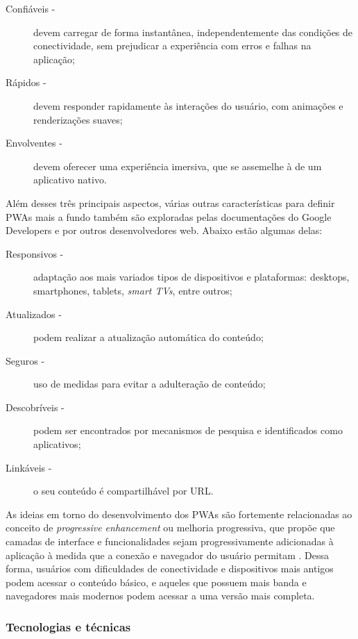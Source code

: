 \begin{description}
\item[Confiáveis -]devem carregar de forma instantânea, independentemente das condições de conectividade, sem prejudicar a experiência com erros e falhas na aplicação;
\item[Rápidos -]devem responder rapidamente às interações do usuário, com animações e renderizações suaves;
\item[Envolventes -]devem oferecer uma experiência imersiva, que se assemelhe à de um aplicativo nativo.
\end{description}

Além desses três principais aspectos, várias outras características para definir PWAs mais a fundo também são exploradas pelas documentações do Google Developers \cite{googledevpwachecklist} e por outros desenvolvedores web. Abaixo estão algumas delas:

\begin{description}
\item[Responsivos -]adaptação aos mais variados tipos de dispositivos e plataformas: desktops, smartphones, tablets, \textit{smart TVs}, entre outros;
\item[Atualizados -]podem realizar a atualização automática do conteúdo;
\item[Seguros -]uso de medidas para evitar a adulteração de conteúdo;
\item[Descobríveis -]podem ser encontrados por mecanismos de pesquisa e identificados como aplicativos;
\item[Linkáveis -]o seu conteúdo é compartilhável por URL.
\end{description}

As ideias em torno do desenvolvimento dos PWAs são fortemente relacionadas ao conceito de \textit{progressive enhancement} ou melhoria progressiva, que propõe que camadas de interface e funcionalidades sejam progressivamente adicionadas à aplicação à medida que a conexão e navegador do usuário permitam \cite{champeon}. Dessa forma, usuários com dificuldades de conectividade e dispositivos mais antigos podem acessar o conteúdo básico, e aqueles que possuem mais banda e navegadores mais modernos podem acessar a uma versão mais completa.

\subsubsection{Tecnologias e técnicas}

